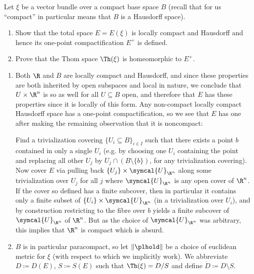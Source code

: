 \begin{exercise}
	Let $\xi$ be a vector bundle over a compact base space $B$ (recall that for us \enquote{compact} in particular means that $B$ is a Hausdorff space).
	\begin{enumerate}
		\item Show that the total space $E = E(\xi)$ is locally compact and Hausdorff and hence its one-point compactification $E^+$ is defined.
		\item Prove that the Thom space $\Th(\xi)$ is homeomorphic to $E^+$.
	\end{enumerate}
\end{exercise}
\begin{solution}
	\leavevmode
	\begin{enumerate}
		\item Both $\R$ and $B$ are locally compact and Hausdorff, and since these properties are both inherited by open subspaces and local in nature, we conclude that $U \times \R^n$ is so as well for all $U \subseteq B$ open, and therefore that $E$ has these properties since it is locally of this form.
			Any non-compact locally compact Hausdorff space has a one-point compactification, so we see that $E$ has one after making the remaining observation that it is noncompact:
			
			Find a trivialization covering $\{U_i \subseteq B\}_{i \in I}$ such that there exists a point $b$ contained in only a single $U_i$ (e.g. by choosing one $U_i$ containing the point and replacing all other $U_j$ by $U_j \cap (B \setminus \{b\})$, for any trivialization covering).
			Now cover $E$ via pulling back $\{U_j\} \times \symcal{U}_{\R^n}$ along some trivialization over $U_j$ for all $j$ where $\symcal{U}_{\R^n}$ is any open cover of $\R^n$.
			If the cover so defined has a finite subcover, then in particular it contains only a finite subset of $\{U_i\} \times \symcal{U}_{\R^n}$ (in a trivialization over $U_i$), and by construction restricting to the fibre over $b$ yields a finite subcover of $\symcal{U}_{\R^n}$ of $\R^n$.
			But as the choice of $\symcal{U}_{\R^n}$ was arbitrary, this implies that $\R^n$ is compact which is absurd.
		\item $B$ is in particular paracompact, so let $\lVert\plhold\rVert$ be a choice of euclidean metric for $\xi$ (with respect to which we implicitly work).
			We abbreviate $D \coloneq D(E)$, $S \coloneq S(E)$ such that $\Th(\xi) = D / S$ and define $\mathring{D} \coloneq D \setminus S$.


\end{enumerate}
\end{solution}
